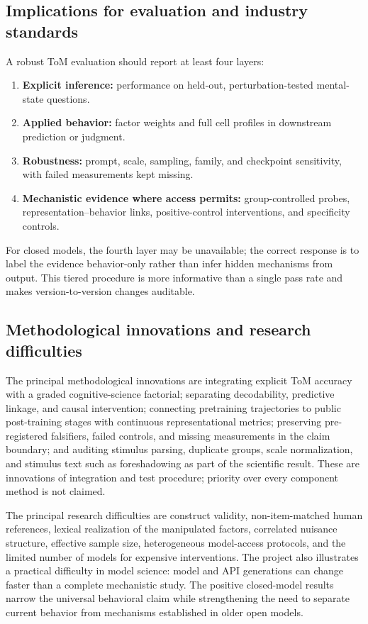 \documentclass[11pt]{article}
\begin{document}
\subsection{Implications for evaluation and industry standards}

A robust ToM evaluation should report at least four layers:
\begin{enumerate}[leftmargin=*]
    \item \textbf{Explicit inference:} performance on held-out, perturbation-tested mental-state questions.
    \item \textbf{Applied behavior:} factor weights and full cell profiles in downstream prediction or judgment.
    \item \textbf{Robustness:} prompt, scale, sampling, family, and checkpoint sensitivity, with failed measurements kept missing.
    \item \textbf{Mechanistic evidence where access permits:} group-controlled probes, representation--behavior links, positive-control interventions, and specificity controls.
\end{enumerate}
For closed models, the fourth layer may be unavailable; the correct response is to label the evidence behavior-only rather than infer hidden mechanisms from output.
This tiered procedure is more informative than a single pass rate and makes version-to-version changes auditable.

\subsection{Methodological innovations and research difficulties}

The principal methodological innovations are integrating explicit ToM accuracy with a graded cognitive-science factorial; separating decodability, predictive linkage, and causal intervention; connecting pretraining trajectories to public post-training stages with continuous representational metrics; preserving pre-registered falsifiers, failed controls, and missing measurements in the claim boundary; and auditing stimulus parsing, duplicate groups, scale normalization, and stimulus text such as foreshadowing as part of the scientific result.
These are innovations of integration and test procedure; priority over every component method is not claimed.

The principal research difficulties are construct validity, non-item-matched human references, lexical realization of the manipulated factors, correlated nuisance structure, effective sample size, heterogeneous model-access protocols, and the limited number of models for expensive interventions.
The project also illustrates a practical difficulty in model science: model and API generations can change faster than a complete mechanistic study.
The positive closed-model results narrow the universal behavioral claim while strengthening the need to separate current behavior from mechanisms established in older open models.
\end{document}
